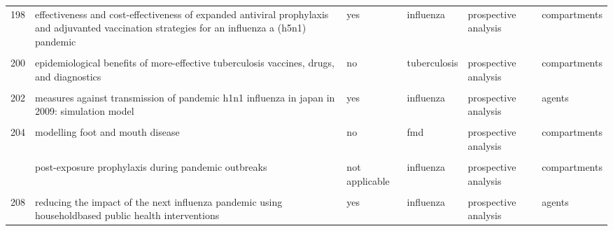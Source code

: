\documentclass[
]{article}
\begin{document}
\begin{landscape}
\begin{longtable}{l>{\raggedright\arraybackslash}p{3.3cm}l>{\raggedright\arraybackslash}p{3.3cm}>{\raggedright\arraybackslash}p{2cm}l}
198 & effectiveness and cost-effectiveness of expanded antiviral prophylaxis and adjuvanted vaccination strategies for an influenza a (h5n1) pandemic & yes & influenza & prospective analysis & compartments\\
\cellcolor{gray!6}{199} & \cellcolor{gray!6}{engineering responses to pandemics} & \cellcolor{gray!6}{no} & \cellcolor{gray!6}{influenza} & \cellcolor{gray!6}{retrospective analysis} & \cellcolor{gray!6}{agents}\\
200 & epidemiological benefits of more-effective tuberculosis vaccines, drugs, and diagnostics & no & tuberculosis & prospective analysis & compartments\\
\addlinespace
\cellcolor{gray!6}{201} & \cellcolor{gray!6}{household epidemics: modelling effects of early stage vaccination} & \cellcolor{gray!6}{yes} & \cellcolor{gray!6}{influenza} & \cellcolor{gray!6}{prospective analysis} & \cellcolor{gray!6}{compartments}\\
202 & measures against transmission of pandemic h1n1 influenza in japan in 2009: simulation model & yes & influenza & prospective analysis & agents\\
\cellcolor{gray!6}{203} & \cellcolor{gray!6}{modeling vaccination campaigns and the fall/winter 2009 activity of the new a(h1n1) influenza in the northern hemisphere} & \cellcolor{gray!6}{yes} & \cellcolor{gray!6}{influenza} & \cellcolor{gray!6}{prospective analysis} & \cellcolor{gray!6}{compartments}\\
204 & modelling foot and mouth disease & no & fmd & prospective analysis & compartments\\
\cellcolor{gray!6}{205} & \cellcolor{gray!6}{modelling of the influenza a(h1n1)v outbreak in mexico city, april-may 2009, with control sanitary measures} & \cellcolor{gray!6}{yes} & \cellcolor{gray!6}{influenza} & \cellcolor{gray!6}{retrospective analysis} & \cellcolor{gray!6}{compartments}\\
\addlinespace
206 & post-exposure prophylaxis during pandemic outbreaks & not applicable & influenza & prospective analysis & compartments\\
\cellcolor{gray!6}{207} & \cellcolor{gray!6}{potential for a global dynamic of influenza a (h1n1)} & \cellcolor{gray!6}{yes} & \cellcolor{gray!6}{influenza} & \cellcolor{gray!6}{prospective analysis} & \cellcolor{gray!6}{compartments}\\
208 & reducing the impact of the next influenza pandemic using householdbased public health interventions & yes & influenza & prospective analysis & agents\\

\end{longtable}
\end{landscape}
\end{document}
